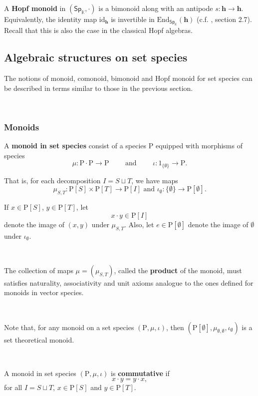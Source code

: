 \documentclass[12pt, reqno]{amsart}
\theoremstyle{definition}
\newcommand{\Ssk}{\mathsf{Sp}_\Kb} %
\newcommand{\Kb}{\mathbb{K}}
\newcommand{\rP}{\mathrm{P}}
\newcommand{\thh}{\mathbf{h}}
\begin{document}
A {\bf Hopf monoid} in $(\Ssk, \cdot)$ is a bimonoid along with an antipode $s:\thh \to \thh $.
Equivalently, the identity map $\text{id}_{\thh}$ is invertible in $\text{End}_{\Ssk}(\thh)$ (c.f. \cite{AM2010}, section 2.7).
Recall that this is also the case in the classical Hopf algebras.
\

\subsection{Algebraic structures on set species}

The notions of monoid, comonoid, bimonoid and Hopf monoid for set species can be described in terms similar to those in the previous section. 

\

\subsubsection{Monoids}
A {\bf monoid in set species} consist of a species $\rP$ equipped with morphisms of species
\begin{equation}
    \mu: \rP \cdot \rP \to \rP \qquad \text{ and } \qquad \iota: \mathrm{1}_{\{\emptyset \} } \to \rP.
\end{equation}

That is, for each decomposition $I=S \sqcup T$, we have maps 
\begin{equation}
    \mu_{S,T}: \rP[S] \times \rP[T]\to \rP[I] \text{ and } \iota_\emptyset: \{\emptyset\} \to \rP[\emptyset].
\end{equation}

If $x \in \rP[S]$, $y \in \rP[T]$,  let 
\[x \cdot y \in \rP[I]\]
denote the image of $(x,y)$ under $\mu_{S,T}$. Also, let $e\in \rP[\emptyset]$ denote the image of $\emptyset$ under $\iota_\emptyset$.

\

The collection of maps $\mu=(\mu_{S,T})$, called the {\bf product} of the monoid, must satisfies naturality, associativity and unit axioms analogue to the ones defined for monoids in vector species.

\

Note that, for any monoid on a set species $(\rP, \mu, \iota)$, then $(\rP[\emptyset], \mu_{\emptyset, \emptyset}, \iota_\emptyset)$ is a set theoretical monoid.

\

A monoid in set species $(\rP, \mu, \iota)$ is {\bf commutative} if
\[x\cdot y=y\cdot x,\]
for all $I=S \sqcup T$, $x \in \rP[S]$ and $y \in \rP[T]$.
\end{document}
